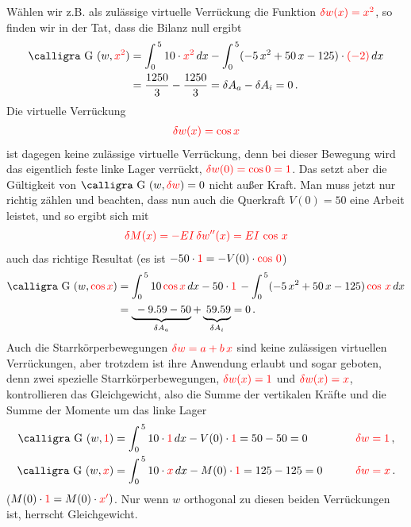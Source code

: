 {{{{W\"{a}hlen wir z.B. als zul\"{a}ssige virtuelle Verr\"{u}ckung die Funktion $\textcolor{red}{\delta w(x) = x^2}$, so finden wir in der Tat, dass die Bilanz null ergibt
\begin{align}
\text{\normalfont\calligra G\,\,}(w, \textcolor{red}{x^2})  &= \int_0^{\,5} 10 \cdot\textcolor{red}{ x^2}\,dx - \int_0^{\,5} (-5\,x^2 + 50\,x - 125)\cdot \textcolor{red}{(-2)}\,dx \nn \\
&= \frac{1250}{3} - \frac{1250}{3} = \delta A_a - \delta A_i = 0\,.
\end{align}
Die virtuelle Verr\"{u}ckung
\begin{align}
\textcolor{red}{\delta w(x) = \cos x}
\end{align}
 ist dagegen keine zul\"{a}ssige virtuelle Verr\"{u}ckung, denn bei dieser Bewegung wird das eigentlich feste linke Lager verr\"{u}ckt, $\textcolor{red}{\delta w(0) = \cos 0 = 1}$. Das setzt aber die G\"{u}ltigkeit von $\text{\normalfont\calligra G\,\,}(w, \textcolor{red}{\delta w}) = 0 $ nicht au{\ss}er Kraft. Man muss jetzt nur richtig z\"{a}hlen und beachten, dass nun auch die Querkraft $V(0) = 50$ eine Arbeit leistet, und so ergibt sich mit
\begin{align}
\textcolor{red}{\delta M(x) = - EI\,\delta w''(x) = EI\,\cos\,x}
\end{align}
auch das richtige Resultat (es ist $-50 \cdot \textcolor{red}{1} = -V(0) \cdot \textcolor{red}{\cos\,0}$)
\begin{align}
\text{\normalfont\calligra G\,\,}(w,\textcolor{red}{\cos x}) &= \int_0^{\,5} 10\,\textcolor{red}{\cos x }\,dx - 50 \cdot \textcolor{red}{1}\, - \int_0^{\,5} (-5\,x^2 + 50\,x - 125)\, \textcolor{red}{\cos\,x}\,dx \nn \\
&= \underbrace{\phantom{[}-9.59 - 50}_{\delta A_a} + \underbrace{\phantom{[}59.59}_{\delta A_i} = 0\,.
\end{align}
Auch die Starrk\"{o}rperbewegungen $\textcolor{red}{\delta w = a + b\,x }$ sind keine zul\"{a}ssigen virtuellen Verr\"{u}ckungen, aber trotzdem ist ihre Anwendung erlaubt und sogar geboten, denn zwei spezielle Starrk\"{o}rperbewegungen, $\textcolor{red}{\delta w(x) = 1}$ und $\textcolor{red}{\delta w(x) = x}$, kontrollieren das Gleichgewicht, also die Summe der vertikalen Kr\"{a}fte und die Summe der Momente um das linke Lager
\begin{alignat}{2}
\text{\normalfont\calligra G\,\,}(w,\textcolor{red}{1}) &= \int_0^{\,5} 10 \cdot \textcolor{red}{1}\, dx - V(0) \cdot \textcolor{red}{1} = 50 - 50 = 0\qquad &&\textcolor{red}{\delta w = 1}\,,\\
\text{\normalfont\calligra G\,\,}(w,\textcolor{red}{x}) &= \int_0^{\,5} 10\cdot\textcolor{red}{x}\,dx - M(0)\cdot \textcolor{red}{1} = 125 - 125 = 0 \qquad &&\textcolor{red}{\delta w = x}\,.
\end{alignat}
($M(0) \cdot \textcolor{red}{1} = M(0) \cdot \textcolor{red}{x'})$.
Nur wenn $w$ orthogonal zu diesen beiden Verr\"{u}ckungen ist, herrscht Gleichgewicht.

}}}}
